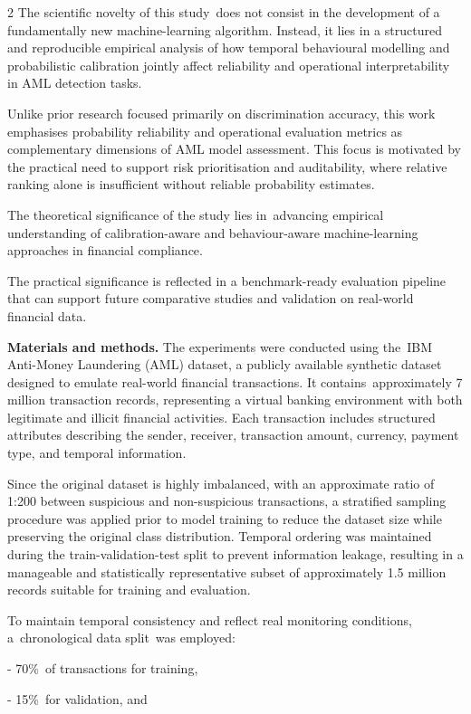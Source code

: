 \begin{multicols}{2}
The scientific novelty of this study~does not consist in the development
of a fundamentally new machine-learning algorithm. Instead, it lies in a
structured and reproducible empirical analysis of how temporal
behavioural modelling and probabilistic calibration jointly affect
reliability and operational interpretability in AML detection tasks.

Unlike prior research focused primarily on discrimination accuracy, this
work emphasises probability reliability and operational evaluation
metrics as complementary dimensions of AML model assessment. This focus
is motivated by the practical need to support risk prioritisation and
auditability, where relative ranking alone is insufficient without
reliable probability estimates.

The theoretical significance of the study lies in~advancing empirical
understanding of calibration-aware and behaviour-aware machine-learning
approaches in financial compliance.

The practical significance is reflected in a benchmark-ready evaluation
pipeline that can support future comparative studies and validation on
real-world financial data.

{\bfseries Materials and methods.} The experiments were conducted using
the~IBM Anti-Money Laundering (AML) dataset, a publicly available
synthetic dataset designed to emulate real-world financial transactions.
It contains~approximately 7 million transaction records, representing a
virtual banking environment with both legitimate and illicit financial
activities. Each transaction includes structured attributes describing
the sender, receiver, transaction amount, currency, payment type, and
temporal information.

Since the original dataset is highly imbalanced, with an approximate
ratio of 1:200 between suspicious and non-suspicious transactions, a
stratified sampling procedure was applied prior to model training to
reduce the dataset size while preserving the original class
distribution. Temporal ordering was maintained during the
train-validation-test split to prevent information leakage, resulting in
a manageable and statistically representative subset of approximately
1.5 million records suitable for training and evaluation.

To maintain temporal consistency and reflect real monitoring conditions,
a~chronological data split~was employed:

- 70\%~of transactions for training,

- 15\%~for validation, and


\end{multicols}
